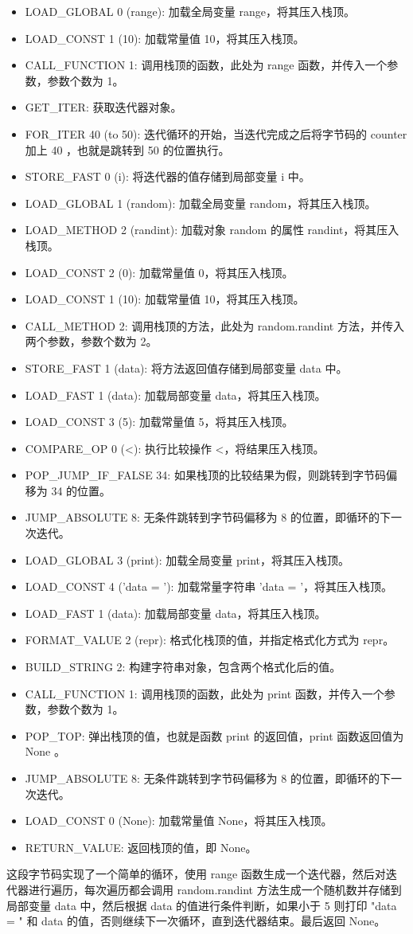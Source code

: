 \begin{itemize}
\item LOAD\_GLOBAL 0 (range): 加载全局变量 range，将其压入栈顶。 
\item LOAD\_CONST 1 (10): 加载常量值 10，将其压入栈顶。 
\item CALL\_FUNCTION 1: 调用栈顶的函数，此处为 range 函数，并传入一个参数，参数个数为 1。 
\item GET\_ITER: 获取迭代器对象。 
\item FOR\_ITER 40 (to 50): 迭代循环的开始，当迭代完成之后将字节码的 counter 加上 40 ，也就是跳转到 50 的位置执行。 
\item STORE\_FAST 0 (i): 将迭代器的值存储到局部变量 i 中。 
\item LOAD\_GLOBAL 1 (random): 加载全局变量 random，将其压入栈顶。 
\item LOAD\_METHOD 2 (randint): 加载对象 random 的属性 randint，将其压入栈顶。 
\item LOAD\_CONST 2 (0): 加载常量值 0，将其压入栈顶。 
\item LOAD\_CONST 1 (10): 加载常量值 10，将其压入栈顶。 
\item CALL\_METHOD 2: 调用栈顶的方法，此处为 random.randint 方法，并传入两个参数，参数个数为 2。 
\item STORE\_FAST 1 (data): 将方法返回值存储到局部变量 data 中。 
\item LOAD\_FAST 1 (data): 加载局部变量 data，将其压入栈顶。 
\item LOAD\_CONST 3 (5): 加载常量值 5，将其压入栈顶。 
\item COMPARE\_OP 0 (<): 执行比较操作 <，将结果压入栈顶。 
\item POP\_JUMP\_IF\_FALSE 34: 如果栈顶的比较结果为假，则跳转到字节码偏移为 34 的位置。 
\item JUMP\_ABSOLUTE 8: 无条件跳转到字节码偏移为 8 的位置，即循环的下一次迭代。 
\item LOAD\_GLOBAL 3 (print): 加载全局变量 print，将其压入栈顶。 
\item LOAD\_CONST 4 ('data = '): 加载常量字符串 'data = '，将其压入栈顶。 
\item LOAD\_FAST 1 (data): 加载局部变量 data，将其压入栈顶。 
\item FORMAT\_VALUE 2 (repr): 格式化栈顶的值，并指定格式化方式为 repr。 
\item BUILD\_STRING 2: 构建字符串对象，包含两个格式化后的值。 
\item CALL\_FUNCTION 1: 调用栈顶的函数，此处为 print 函数，并传入一个参数，参数个数为 1。 
\item POP\_TOP: 弹出栈顶的值，也就是函数 print 的返回值，print 函数返回值为 None 。 
\item JUMP\_ABSOLUTE 8: 无条件跳转到字节码偏移为 8 的位置，即循环的下一次迭代。 
\item LOAD\_CONST 0 (None): 加载常量值 None，将其压入栈顶。 
\item RETURN\_VALUE: 返回栈顶的值，即 None。 
\end{itemize}
这段字节码实现了一个简单的循环，使用 range 函数生成一个迭代器，然后对迭代器进行遍历，每次遍历都会调用 random.randint 方法生成一个随机数并存储到局部变量 data 中，然后根据 data 的值进行条件判断，如果小于 5 则打印 "data = " 和 data 的值，否则继续下一次循环，直到迭代器结束。最后返回 None。
